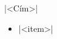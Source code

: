 \documentclass[col2]{osszefoglalo}
\begin{document}
\begin{osszefoglalo}{|<Cím>|}
\begin{itemize}
\item |<item>|
\end{itemize}
\end{osszefoglalo}
\end{document}
